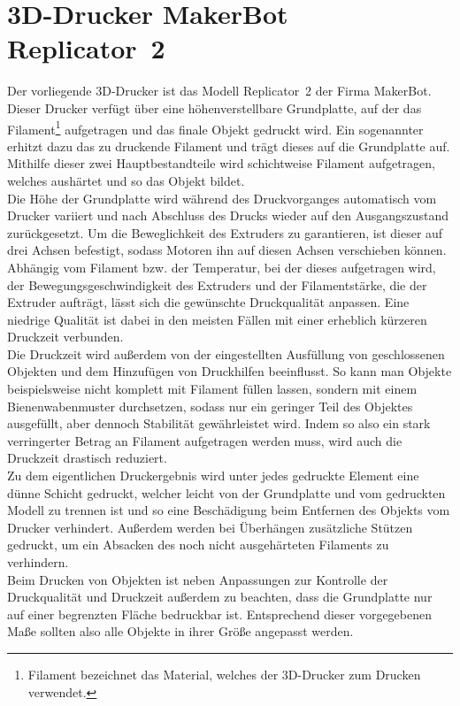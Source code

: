 \section{3D-Drucker MakerBot Replicator\texttrademark\ 2}
Der vorliegende 3D-Drucker ist das Modell Replicator\texttrademark\ 2 der Firma MakerBot.
Dieser Drucker verfügt über eine höhenverstellbare Grundplatte, auf der das Filament\footnote{Filament bezeichnet das Material, welches der 3D-Drucker zum Drucken verwendet.} aufgetragen und das finale Objekt gedruckt wird.
Ein sogenannter  erhitzt dazu das zu druckende Filament und trägt dieses auf die Grundplatte auf. 
Mithilfe dieser zwei Hauptbestandteile wird schichtweise Filament aufgetragen, welches aushärtet und so das Objekt bildet. \\
Die Höhe der Grundplatte wird während des Druckvorganges automatisch vom Drucker variiert und nach Abschluss des Drucks wieder auf den Ausgangszustand zurückgesetzt.
Um die Beweglichkeit des Extruders zu garantieren, ist dieser auf drei Achsen befestigt, sodass Motoren ihn auf diesen Achsen verschieben können. \\
Abhängig vom Filament bzw. der Temperatur, bei der dieses aufgetragen wird, der Bewegungsgeschwindigkeit des Extruders und der Filamentstärke, die der Extruder aufträgt, lässt sich die gewünschte Druckqualität anpassen.
Eine niedrige Qualität ist dabei in den meisten Fällen mit einer erheblich kürzeren Druckzeit verbunden. \\
Die Druckzeit wird außerdem von der eingestellten Ausfüllung von geschlossenen Objekten und dem Hinzufügen von Druckhilfen beeinflusst.
So kann man Objekte beispielsweise nicht komplett mit Filament füllen lassen, sondern mit einem Bienenwabenmuster durchsetzen, sodass nur ein geringer Teil des Objektes ausgefüllt, aber dennoch Stabilität gewährleistet wird.
Indem so also ein stark verringerter Betrag an Filament aufgetragen werden muss, wird auch die Druckzeit drastisch reduziert. \\
Zu dem eigentlichen Druckergebnis wird unter jedes gedruckte Element eine dünne Schicht gedruckt, welcher leicht von der Grundplatte und vom gedruckten Modell zu trennen ist und so eine Beschädigung beim Entfernen des Objekts vom Drucker verhindert.
Außerdem werden bei Überhängen zusätzliche Stützen gedruckt, um ein Absacken des noch nicht ausgehärteten Filaments zu verhindern.  \\
Beim Drucken von Objekten ist neben Anpassungen zur Kontrolle der Druckqualität und Druckzeit außerdem zu beachten, dass die Grundplatte nur auf einer begrenzten Fläche bedruckbar ist.
Entsprechend dieser vorgegebenen Maße sollten also alle Objekte in ihrer Größe angepasst werden.
